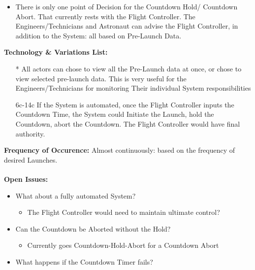\documentclass[letterpaper]{article}
\begin{document}
\begin{itemize}
\item There is only one point of Decision for the Countdown Hold/
Countdown Abort.  That currently rests with the Flight Controller.  The
Engineers/Technicians and Astronaut can advise the Flight Controller,
in addition to the System:  all based on Pre-Launch Data.
\end{itemize}
\textbf{Technology \& Variations List: }
\begin{itemize}
\item[*] All actors can chose to view all the Pre-Launch data at once,
or chose to view selected pre-launch data.  This is very useful for the
Engineers/Technicians for monitoring Their individual System
responsibilities
\item [6c-14c]If the System is automated, once the Flight Controller 
inputs the Countdown Time, the System could Initiate the Launch, 
hold the Countdown, abort the Countdown.  The Flight Controller would
have final authority.
\end{itemize}
\textbf{Frequency of Occurence:  }  Almost continuously:  based on the
frequency of desired Launches.\\\\
\textbf{Open Issues:  }
\begin{itemize}
\item What about a fully automated System?
\begin{itemize}
\item The Flight Controller would need to maintain ultimate control?
\end{itemize}
\item Can the Countdown be Aborted without the Hold?
\begin{itemize}
\item Currently goes Countdown-Hold-Abort for a Countdown Abort
\end{itemize}
\item What happens if the Countdown Timer fails?
\end{itemize}
\end{document}

